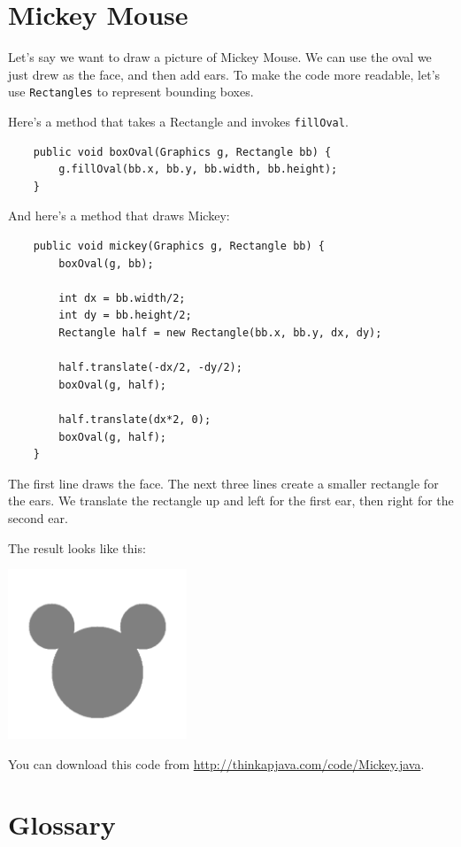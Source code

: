 \section{Mickey Mouse}

Let's say we want to draw a picture of Mickey Mouse.  We can use the
oval we just drew as the face, and then add ears.  To make the code
more readable, let's use {\tt Rectangles} to represent bounding boxes.

Here's a method that takes a Rectangle and invokes {\tt fillOval}.

\begin{lstlisting}
    public void boxOval(Graphics g, Rectangle bb) {
        g.fillOval(bb.x, bb.y, bb.width, bb.height);
    }
\end{lstlisting}

And here's a method that draws Mickey:

\begin{lstlisting}
    public void mickey(Graphics g, Rectangle bb) {
        boxOval(g, bb);

        int dx = bb.width/2;
        int dy = bb.height/2;
        Rectangle half = new Rectangle(bb.x, bb.y, dx, dy);

        half.translate(-dx/2, -dy/2);
        boxOval(g, half);

        half.translate(dx*2, 0);
        boxOval(g, half);
    }
\end{lstlisting}

The first line draws the face.  The next three lines create
a smaller rectangle for the ears.  We translate the rectangle
up and left for the first ear, then right for the second ear.

The result looks like this:

\includegraphics[height=2in]{figs/mickey.pdf}

You can download this code from
\url{http://thinkapjava.com/code/Mickey.java}.


\section{Glossary}

